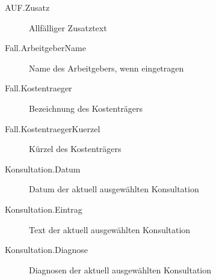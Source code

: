 \begin{description}
  \item [AUF.Zusatz] Allfälliger Zusatztext
  \item [Fall.ArbeitgeberName] Name des Arbeitgebers, wenn eingetragen
  \item [Fall.Kostentraeger] Bezeichnung des Kostenträgers
  \item [Fall.KostentraegerKuerzel] Kürzel des Kostenträgers
  \item [Konsultation.Datum] Datum der aktuell ausgewählten Konsultation
  \item [Konsultation.Eintrag] Text der aktuell ausgewählten Konsultation
  \item [Konsultation.Diagnose] Diagnosen der aktuell ausgewählten Konsultation

\end{description}

